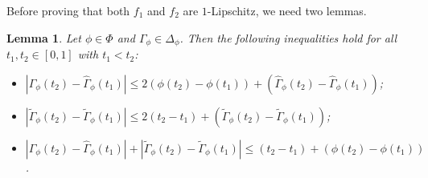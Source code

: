 \documentclass[12pt]{article}
\theoremstyle{plain}
\newtheorem{lemm}[thrm]{Lemma}%
\theoremstyle{definition}
\begin{document}
Before proving that both $f_1$ and $f_2$ are $1$-Lipschitz, we need two lemmas.
\begin{lemm}\label{lemm-evofGamm}
Let $\phi\in\Phi$ and $\Gamma_\phi\in\Delta_\phi$. Then the following inequalities hold for all $t_1, t_2\in[0, 1]$ with $t_1<t_2$:
\begin{itemize}\setlength{\itemindent}{10pt}
\item[{\rm (i)}] $|\hat{\Gamma}_\phi(t_2)-\hat{\Gamma}_\phi(t_1)|\leq 2(\phi(t_2)-\phi(t_1))+ (\hat{\Gamma}_\phi(t_2)-\hat{\Gamma}_\phi(t_1))$;
\item[{\rm (ii)}] $|\tilde{\Gamma}_\phi(t_2)-\tilde{\Gamma}_\phi(t_1)|\leq 2(t_2-t_1)+(\tilde{\Gamma}_\phi(t_2)-\tilde{\Gamma}_\phi(t_1))$;
\item[{\rm (iii)}] $|\hat{\Gamma}_\phi(t_2)-\hat{\Gamma}_\phi(t_1)|+|\tilde{\Gamma}_\phi(t_2)-\tilde{\Gamma}_\phi(t_1)|\leq (t_2-t_1)+(\phi(t_2)-\phi(t_1))$.
\end{itemize}
\end{lemm}
\end{document}
